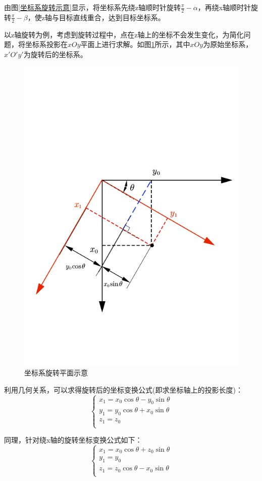 \documentclass[withoutpreface,bwprint]{cumcmthesis} %
\begin{document}
	由图\ref{坐标系旋转示意}显示，将坐标系先绕z轴顺时针旋转$\frac{\pi}{2}-\alpha$，再绕x轴顺时针旋转$\frac{\pi}{2}-\beta$，使z轴与目标直线重合，达到目标坐标系。
	
	以z轴旋转为例，考虑到旋转过程中，点在z轴上的坐标不会发生变化，为简化问题，将坐标系投影在$xOy$平面上进行求解。如图\ref{坐标系旋转平面示意}所示，其中$xOy$为原始坐标系，$x'O'y'$为旋转后的坐标系。
	
	\begin{figure}[H]
		\centering
		\includegraphics[height=0.6\textwidth]{坐标系旋转平面示意.png}
		\caption{坐标系旋转平面示意}\label{坐标系旋转平面示意}
	\end{figure}
	
	利用几何关系，可以求得旋转后的坐标变换公式(即求坐标轴上的投影长度)：
	\begin{equation}\label{z轴旋转公式}
	\left\{ \begin{array}{l}
	x_1=x_0\cos \theta -y_0\sin \theta\\
	y_1=y_0\cos \theta +x_0\sin \theta\\
	z_1=z_0\\
	\end{array} \right. 
	\end{equation}
	
	同理，针对绕x轴的旋转坐标变换公式如下：
	\begin{equation}\label{x轴旋转公式}
	\left\{ \begin{array}{l}
	x_1=x_0\cos \theta +z_0\sin \theta\\
	y_1=y_0\\
	z_1=z_0\cos \theta -x_0\sin \theta\\
	\end{array} \right. 
	\end{equation}
	
\end{document}
